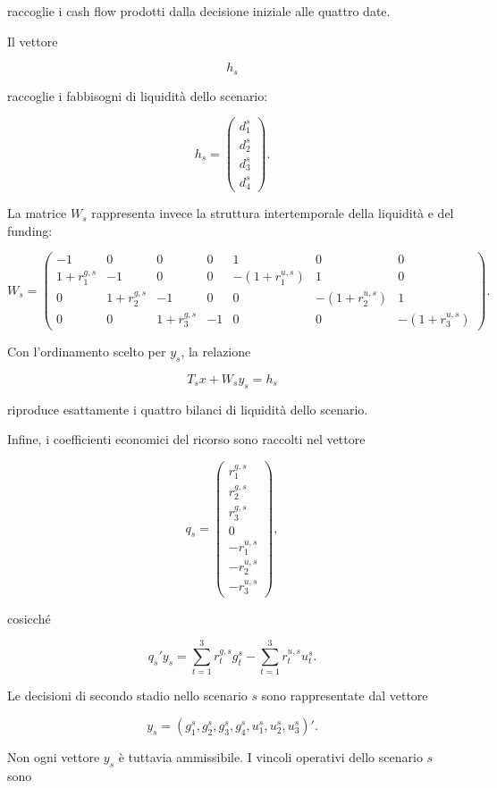 \noindent raccoglie i cash flow prodotti dalla decisione iniziale alle quattro
date.

Il vettore

\[
h_s
\]

\noindent raccoglie i fabbisogni di liquidit\`a dello scenario:

\[
h_s
=
\begin{pmatrix}
d_1^s\\
d_2^s\\
d_3^s\\
d_4^s
\end{pmatrix}.
\]

La matrice $W_s$ rappresenta invece la struttura intertemporale della
liquidit\`a e del funding:

\[
W_s
=
\begin{pmatrix}
-1 & 0 & 0 & 0 & 1 & 0 & 0\\
1+r_1^{g,s} & -1 & 0 & 0 &
-(1+r_1^{u,s}) & 1 & 0\\
0 & 1+r_2^{g,s} & -1 & 0 &
0 & -(1+r_2^{u,s}) & 1\\
0 & 0 & 1+r_3^{g,s} & -1 &
0 & 0 & -(1+r_3^{u,s})
\end{pmatrix}.
\]

Con l'ordinamento scelto per $y_s$, la relazione

\[
T_sx+W_sy_s=h_s
\]

\noindent riproduce esattamente i quattro bilanci di liquidit\`a dello scenario.

Infine, i coefficienti economici del ricorso sono raccolti nel
vettore

\[
q_s
=
\begin{pmatrix}
r_1^{g,s}\\
r_2^{g,s}\\
r_3^{g,s}\\
0\\
-r_1^{u,s}\\
-r_2^{u,s}\\
-r_3^{u,s}
\end{pmatrix},
\]

\noindent cosicch\'e

\[
q_s'y_s
=
\sum_{t=1}^{3}r_t^{g,s}g_t^s
-
\sum_{t=1}^{3}r_t^{u,s}u_t^s.
\]

Le decisioni di secondo stadio nello scenario $s$ sono rappresentate dal
vettore

\[
y_s
=
(g_1^s,g_2^s,g_3^s,g_4^s,u_1^s,u_2^s,u_3^s)'.
\]

Non ogni vettore $y_s$ \`e tuttavia ammissibile. I vincoli operativi dello
scenario $s$ sono

